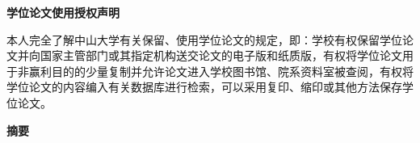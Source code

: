 {%
\vspace*{60pt}
\begin{center}
  \sanhao\song\bfseries{学位论文使用授权声明}
\end{center}

\song{}
本人完全了解中山大学有关保留、使用学位论文的规定，即：学校有权保留学位论文并向国家主管部门或其指定机构送交论文的电子版和纸质版，有权将学位论文用于非赢利目的的少量复制并允许论文进入学校图书馆、院系资料室被查阅，有权将学位论文的内容编入有关数据库进行检索，可以采用复印、缩印或其他方法保存学位论文。

\vspace*{40pt}
\begin{center}
\setlength{\@title@width}{5cm}
  {\sihao{}
 }
\end{center}
\thispagestyle{empty}   %

\newpage
\thispagestyle{empty}   %
\mbox{}


\clearpage
\setcounter{page}{1}                    %


\begin{flushleft}
\setlength{\@title@width}{5cm}
  {\wuhao{}
 }
\end{flushleft}

\vspace{\baselineskip}
\begin{center}
\sanhao\song\bfseries 摘\qquad 要
\end{center}

}
